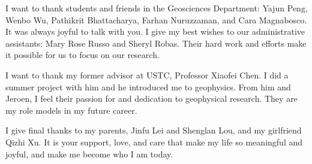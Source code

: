 I want to thank students and friends in the Geosciences Department: Yajun Peng, Wenbo Wu, 
Pathikrit Bhattacharya, Farhan Nuruzzaman, and Cara Magnabosco. It was always joyful to talk
with you. I give my best wishes to our administrative assistants: Mary
Rose Russo and Sheryl Robas. Their hard work and efforts make it possible for us
to focus on our research.

I want to thank my former advisor at USTC, Professor Xiaofei Chen. I did a summer project with him
and he introduced me to geophysics. From him and Jeroen, I feel their passion
for and dedication to geophysical research. They are my role models in my future career.

I give final thanks to my parents, Jinfu Lei and Shenglan Lou, and my girlfriend Qizhi Xu.
It is your support, love, and care that make my life so meaningful and joyful, and make
me become who I am today.

